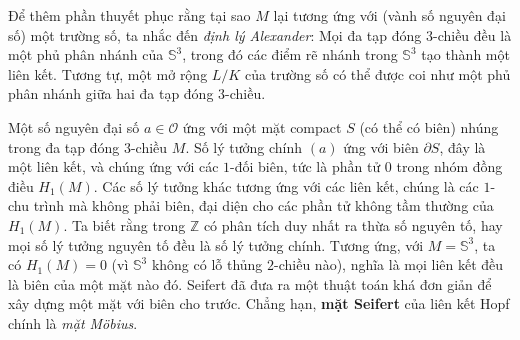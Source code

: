 \documentclass[12pt]{article}
\begin{document}
Để thêm phần thuyết phục rằng tại sao $M$ lại tương ứng với (vành số nguyên đại số) một trường số, ta nhắc đến {\it định lý Alexander}: Mọi đa tạp đóng $3$-chiều đều là một phủ phân nhánh của $\mathbb{S}^3$, trong đó các điểm rẽ nhánh trong $\mathbb{S}^3$ tạo thành một liên kết. Tương tự, một mở rộng $L/K$ của trường số có thể được coi như một phủ phân nhánh giữa hai đa tạp đóng $3$-chiều.

Một số nguyên đại số $a \in \mathcal{O}$ ứng với một mặt compact $S$ (có thể có biên) nhúng trong đa tạp đóng $3$-chiều $M$. Số lý tưởng chính $(a)$ ứng với biên $\partial S$, đây là một liên kết, và chúng ứng với các $1$-đối biên, tức là phần tử $0$ trong nhóm đồng điều $H_1(M)$. Các số lý tưởng khác tương ứng với các liên kết, chúng là các $1$-chu trình mà không phải biên, đại diện cho các phần tử không tầm thường của $H_1(M)$. Ta biết rằng trong $\mathbb{Z}$ có phân tích duy nhất ra thừa số nguyên tố, hay mọi số lý tưởng nguyên tố đều là số lý tưởng chính. Tương ứng, với $M = \mathbb{S}^3$, ta có $H_1(M) = 0$ (vì $\mathbb{S}^3$ không có lỗ thủng $2$-chiều nào), nghĩa là mọi liên kết đều là biên của một mặt nào đó. Seifert đã đưa ra một thuật toán khá đơn giản để xây dựng một mặt với biên cho trước. Chẳng hạn, {\bf mặt Seifert} của liên kết Hopf chính là {\it mặt M\"obius}.
\end{document}
